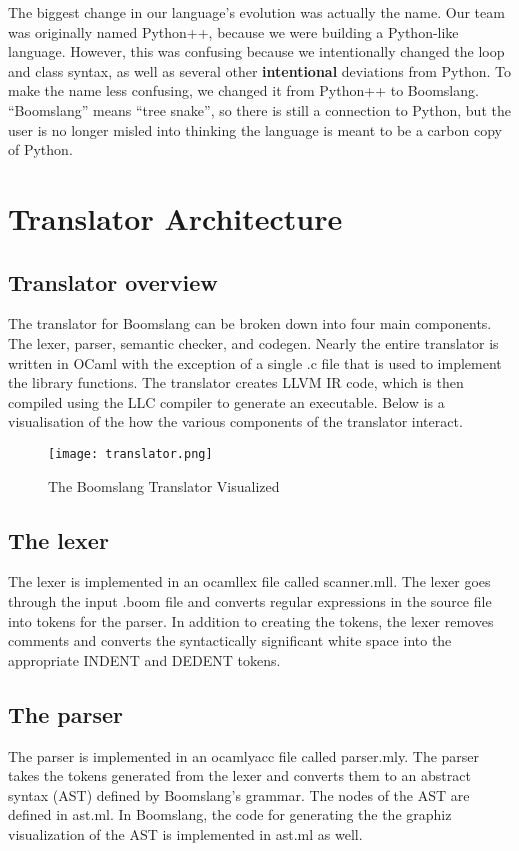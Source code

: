 \documentclass{article}
\begin{document}
The biggest change in our language's evolution was actually the name. Our team was originally named Python++, because we were building a Python-like language. However, this was confusing because we intentionally changed the loop and class syntax, as well as several other \textbf{intentional} deviations from Python. To make the name less confusing, we changed it from Python++ to Boomslang. ``Boomslang'' means ``tree snake'', so there is still a connection to Python, but the user is no longer misled into thinking the language is meant to be a carbon copy of Python.

\section{Translator Architecture}

\subsection{Translator overview}
The translator for Boomslang can be broken down into four main components. The lexer, parser, semantic checker, and codegen. Nearly the entire translator is written in OCaml with the exception of a single .c file that is used to implement the library functions. The translator creates LLVM IR code, which is then compiled using the LLC compiler to generate an executable. Below is a visualisation of the how the various components of the translator interact. 

\begin{figure}[h]
\caption{The Boomslang Translator Visualized}
\centering
\texttt{[image: translator.png]}
\label{fig:architecture}
\end{figure}

\subsection{The lexer}
The lexer is implemented in an ocamllex file called scanner.mll. The lexer goes through the input .boom file and converts regular expressions in the source file into tokens for the parser. In addition to creating the tokens, the lexer removes comments and converts the syntactically significant white space into the appropriate INDENT and DEDENT tokens.

\subsection{The parser}
The parser is implemented in an ocamlyacc file called parser.mly. The parser takes the tokens generated from the lexer and converts them to an abstract syntax (AST) defined by Boomslang's grammar. The nodes of the AST are defined in ast.ml. In Boomslang, the code for generating the the graphiz visualization of the AST is implemented in ast.ml as well. 
\end{document}
